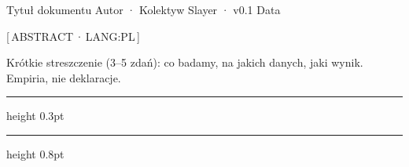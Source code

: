 %
%

\slayertitle
  {Tytuł dokumentu}%
  {Autor · Kolektyw Slayer · v0.1}%
  {Data}%

\noindent
{\fontsize{6}{6}\selectfont\ttfamily\color{ALERTRED!70}%
  [\,ABSTRACT\,·\,LANG:PL\,]}\par\vspace{2pt}
{\fontsize{8.5}{12}\selectfont\noindent
Krótkie streszczenie (3--5 zdań): co badamy, na jakich danych,
jaki wynik. Empiria, nie deklaracje.
\corrk{}}

\vspace{4pt}
{\color{sLightGrid}\hrule height 0.3pt}\vspace{1pt}%
{\color{ALERTRED}\hrule height 0.8pt}
\vspace{8pt}
